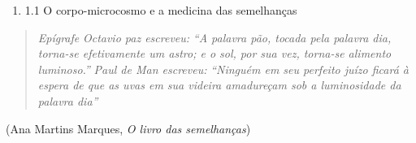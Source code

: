 \begin{enumerate}
\def\labelenumi{\arabic{enumi}.}
\tightlist
\item
  1.1 O corpo-microcosmo e a medicina das semelhanças
\end{enumerate}

\begin{quote}
\emph{Epígrafe} \emph{Octavio paz escreveu:} \emph{``A palavra pão,
tocada pela palavra dia,\emph{ }torna-se efetivamente um astro; e o
sol,\emph{ }por sua vez, torna-se alimento\emph{ }luminoso.''}
\emph{Paul de Man escreveu:} \emph{``Ninguém em seu perfeito juízo
ficará à espera\emph{ }de que as uvas em sua videira amadureçam\emph{
}sob a luminosidade\emph{ }da palavra dia''}
\end{quote}

(Ana Martins Marques, \emph{O livro das semelhanças})

